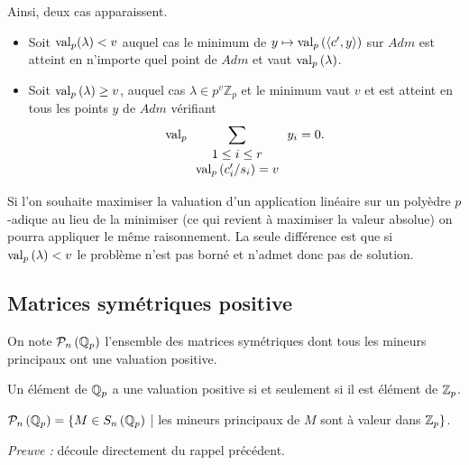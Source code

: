 Ainsi, deux cas apparaissent.
\begin{itemize}
	\item Soit $\text{val}_p( \lambda) < v$ auquel cas le minimum de $y\mapsto \text{val}_p\left(\left<c',y \right>\right)$ sur $Adm$ est atteint en n'importe quel point de $Adm$ et vaut $\text{val}_p\left( \lambda\right)$.
	\item Soit $\text{val}_p\left( \lambda \right) \ge v$, auquel cas $\lambda \in p^{v} \mathbb{Z}_p$ et le minimum vaut $v $ et est atteint en tous les points $y$ de $Adm$ vérifiant
	$$\text{val}_p\sum \limits_{\begin{array}{c} 1\le i\le r\\ \text{val}_p\left(c'_{i}/{s_{i}} \right) = v  \end{array}   } y_{i} = 0.$$ 

\end{itemize}
\begin{remarque}
	Si l'on souhaite maximiser la valuation d'un application linéaire sur un polyèdre $p$-adique au lieu de la minimiser (ce qui revient à maximiser la valeur absolue) on pourra appliquer le même raisonnement. La seule différence est que si $\text{val}_p\left( \lambda\right) < v$ le problème n'est pas borné et n'admet donc pas de solution. 
\end{remarque}

\iffalse
\subsection{Matrices symétriques positive} 

\begin{definition}
	On note $\mathcal{P}_n\left( \mathbb{Q}_p \right) $ l'ensemble des matrices symétriques dont tous les mineurs principaux ont une valuation positive.
\end{definition} 

\begin{rappel}
	
Un élément de $ \mathbb{Q}_p$ a une valuation positive si et seulement si il est élément de $ \mathbb {Z}_p $. 
\end{rappel}

\begin{propriete}
	
	$\mathcal{P}_n\left( \mathbb{Q}_p \right) = \{ M \in S_n\left( \mathbb{Q}_p \right)$ | les\- min\-eurs\- prin\-ci\-paux\- de\- $M$ \-sont \-à \-va\-leur \-dans\- $ \mathbb {Z}_p  \} $.
\end{propriete}

	\textit{Preuve :} découle directement du rappel précédent. 
	\medskip


